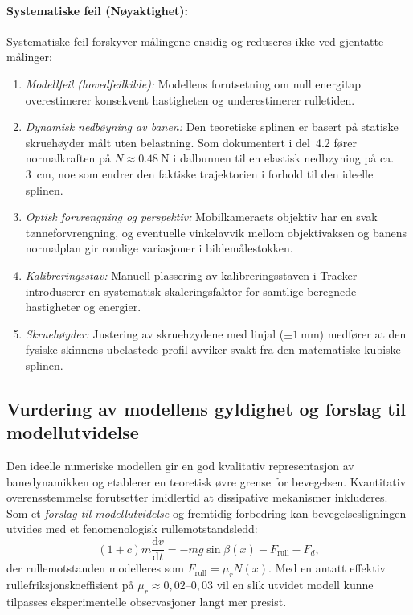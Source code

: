 \documentclass[11pt,a4paper]{article}
\begin{document}
\paragraph{Systematiske feil (Nøyaktighet):}
Systematiske feil forskyver målingene ensidig og reduseres ikke ved gjentatte målinger:
\begin{enumerate}
    \item \emph{Modellfeil (hovedfeilkilde):} Modellens forutsetning om null energitap overestimerer konsekvent hastigheten og underestimerer rulletiden.
    \item \emph{Dynamisk nedbøyning av banen:} Den teoretiske splinen er basert på statiske skruehøyder målt uten belastning. Som dokumentert i del~4.2 fører normalkraften på $N \approx \SI{0,48}{\newton}$ i dalbunnen til en elastisk nedbøyning på ca. \SI{3}{\centi\meter}, noe som endrer den faktiske trajektorien i forhold til den ideelle splinen.
    \item \emph{Optisk forvrengning og perspektiv:} Mobilkameraets objektiv har en svak tønneforvrengning, og eventuelle vinkelavvik mellom objektivaksen og banens normalplan gir romlige variasjoner i bildemålestokken.
    \item \emph{Kalibreringsstav:} Manuell plassering av kalibreringsstaven i Tracker introduserer en systematisk skaleringsfaktor for samtlige beregnede hastigheter og energier.
    \item \emph{Skruehøyder:} Justering av skruehøydene med linjal ($\pm\SI{1}{\milli\meter}$) medfører at den fysiske skinnens ubelastede profil avviker svakt fra den matematiske kubiske splinen.
\end{enumerate}

\subsection{Vurdering av modellens gyldighet og forslag til modellutvidelse}
Den ideelle numeriske modellen gir en god kvalitativ representasjon av banedynamikken og etablerer en teoretisk øvre grense for bevegelsen. Kvantitativ overensstemmelse forutsetter imidlertid at dissipative mekanismer inkluderes. Som et \emph{forslag til modellutvidelse} og fremtidig forbedring kan bevegelsesligningen utvides med et fenomenologisk rullemotstandsledd:
\begin{equation}
    (1 + c)m \frac{\mathrm{d}v}{\mathrm{d}t} = -mg\sin\beta(x) - F_{\text{rull}} - F_d,
\end{equation}
der rullemotstanden modelleres som $F_{\text{rull}} = \mu_r N(x)$. Med en antatt effektiv rullefriksjonskoeffisient på $\mu_r \approx 0{,}02$--$0{,}03$ vil en slik utvidet modell kunne tilpasses eksperimentelle observasjoner langt mer presist.
\end{document}
